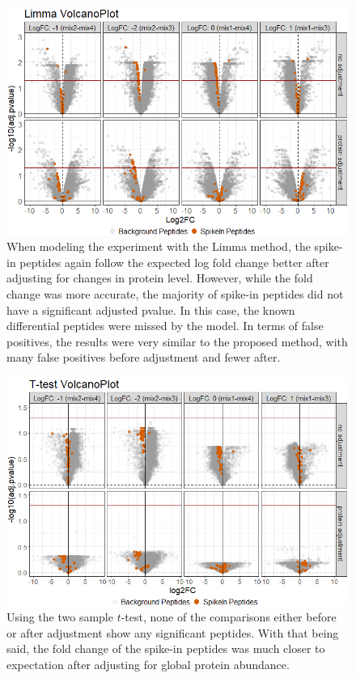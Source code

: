 \documentclass{mcp}
\begin{document}
\begin{figure}[h!]
\centering
\includegraphics[width=.85\textwidth]{sim_new/spike_in_limma_volcano}
\caption{When modeling the experiment with the Limma method, the spike-in peptides again follow the expected log fold change better after adjusting for changes in protein level. However, while the fold change was more accurate, the majority of spike-in peptides did not have a significant adjusted pvalue. In this case, the known differential peptides were missed by the model. In terms of false positives, the results were very similar to the proposed method, with many false positives before adjustment and fewer after. \label{fig:spike_volcano_limma}}
\end{figure}

\begin{figure}[h!]
\centering
\includegraphics[width=.85\textwidth]{sim_new/spike_in_ttest_volcano}
\caption{Using the two sample $t$-test, none of the comparisons either before or after adjustment show any significant peptides. With that being said, the fold change of the spike-in peptides was much closer to expectation after adjusting for global protein abundance. \label{fig:spike_volcano_ttest}}
\end{figure}
\end{document}
